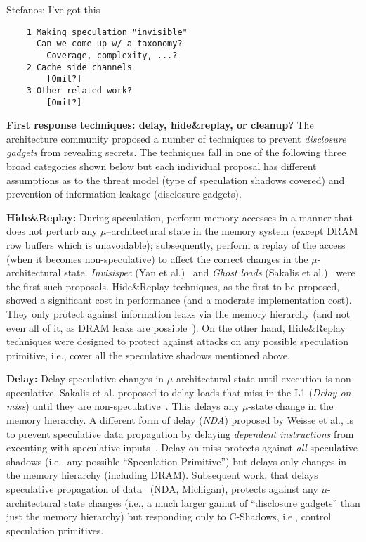 {\color{red} Stefanos: I've got this}
\begin{verbatim}
    1 Making speculation "invisible"
      Can we come up w/ a taxonomy?
        Coverage, complexity, ...?
    2 Cache side channels 
        [Omit?]
    3 Other related work?
        [Omit?]
\end{verbatim}

\noindent \textbf{First response techniques: delay, hide\&replay, or cleanup?}
The architecture community proposed a number of techniques to prevent \emph{disclosure gadgets} from revealing secrets. The techniques fall in one of the following three broad categories shown below but each individual proposal has different assumptions as to the threat model (type of speculation shadows covered) and prevention of information leakage (disclosure gadgets).
\squishlist
\item{\textbf{Hide\&Replay:}} During speculation, perform memory accesses in a manner that does not perturb any $\mu$--architectural state in the memory system (except DRAM row buffers which is unavoidable); subsequently, perform a replay of the access (when it becomes non-speculative) to affect the correct changes in the $\mu$-architectural state. \emph{Invisispec} (Yan et al.)~\cite{yan_invisispec:MICRO2018} and \emph{Ghost loads} (Sakalis et al.)~\cite{sakalis+:CF2019ghost} were the first such proposals. 
Hide\&Replay techniques, as the first to be proposed, showed a significant cost in performance (and a moderate implementation cost). They only protect against information leaks via the memory hierarchy (and not even all of it, as DRAM leaks are possible~\cite{pessl2016drama}). On the other hand, Hide\&Replay techniques were designed to protect against attacks on any possible speculation primitive, i.e., cover all the speculative shadows mentioned above. 
\item{\textbf{Delay:}} Delay speculative changes in $\mu$-architectural state until execution is non-speculative. Sakalis et al. proposed to delay loads that miss in the L1 (\emph{Delay on miss}) until they are non-speculative~\cite{sakalis+:ISCA2019vp}. This delays any $\mu$-state change in the memory hierarchy. A different form of delay (\emph{NDA}) proposed by Weisse et al., is to prevent speculative data propagation by delaying \emph{dependent instructions} from executing with speculative inputs~\cite{weisse2019nda}. Delay-on-miss protects against \emph{all} speculative shadows (i.e., any possible ``Speculation Primitive'') but delays only changes in the memory hierarchy (including DRAM). Subsequent work, that delays speculative propagation of data~\cite{weisse2019nda} (NDA, Michigan), protects against any $\mu$-architectural state changes (i.e., a much larger gamut of ``disclosure gadgets'' than just the memory hierarchy) but responding only to C-Shadows, i.e., control speculation primitives.
